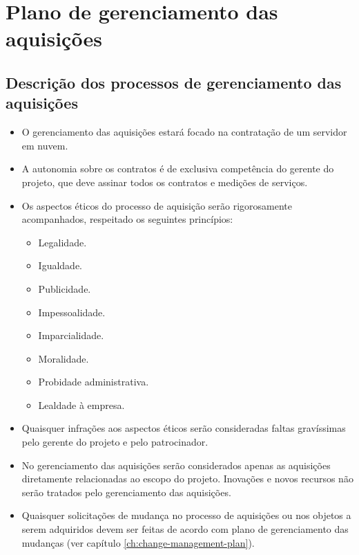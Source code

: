  
\chapter{Plano de gerenciamento das aquisições}

\section{Descrição dos processos de gerenciamento das aquisições}

\begin{itemize}
	\item O gerenciamento das aquisições estará focado na contratação de um servidor em nuvem.
	\item A autonomia sobre os contratos é de exclusiva competência do gerente do projeto, que deve assinar todos os contratos e medições de serviços.
	\item Os aspectos éticos do processo de aquisição serão rigorosamente acompanhados, respeitado os seguintes princípios:
	\begin{itemize}
		\item Legalidade.
		\item Igualdade.
		\item Publicidade.
		\item Impessoalidade.
		\item Imparcialidade.
		\item Moralidade.
		\item Probidade administrativa.
		\item Lealdade à empresa.
	\end{itemize}
	\item Quaisquer infrações aos aspectos éticos serão consideradas faltas gravíssimas pelo gerente do projeto e pelo patrocinador.
	\item No gerenciamento das aquisições serão considerados apenas as aquisições diretamente relacionadas ao escopo do projeto. Inovações e novos recursos não serão tratados pelo gerenciamento das aquisições.
	\item Quaisquer solicitações de mudança no processo de aquisições ou nos objetos a serem adquiridos devem ser feitas de acordo com plano de gerenciamento das mudanças (ver capítulo \ref{ch:change-management-plan}).
\end{itemize}

